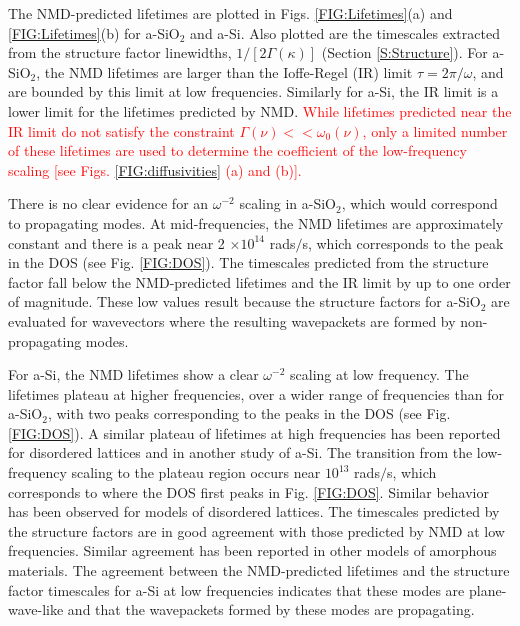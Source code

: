 \documentclass[aps,prb,twocolumn,superscriptaddress,footinbib,amsmath,amssymb,floatfix]{revtex4}
\begin{document}
The NMD-predicted lifetimes are plotted in Figs. 
\ref{FIG:Lifetimes}(a) and \ref{FIG:Lifetimes}(b) 
for a-SiO$_2$ and a-Si. 
Also plotted are the timescales extracted from the structure 
factor linewidths, $1/[2\Gamma(\kappa)]$ (Section \ref{S:Structure}). 
For a-SiO$_2$, the NMD lifetimes are larger than 
the Ioffe-Regel (IR) limit $\tau = 2\pi/\omega$,
\cite{taraskin_determination_1999} and are bounded by  
this limit at low frequencies. Similarly for a-Si, the IR limit is 
a lower limit for the lifetimes predicted by NMD. 
\textcolor{red}{
While lifetimes 
predicted near the IR limit do not satisfy the constraint 
$\Gamma(\nu) << \omega_0(\nu)$, only a limited number of these 
lifetimes are used to determine the coefficient of the low-frequency 
scaling [see Figs. \ref{FIG:diffusivities} (a) and (b)]. 
}

There is no clear evidence for an $\omega^{-2}$ scaling in a-SiO$_2$, 
which would correspond to propagating modes.  
At mid-frequencies, the NMD lifetimes are approximately constant and  
there is a peak near 2 $\times 10^{14}$ rads$/$s, which corresponds to 
the peak in the DOS (see Fig. \ref{FIG:DOS}). 
The timescales predicted from the 
structure factor fall below the NMD-predicted lifetimes 
and the IR limit by up to one order of magnitude. 
These low values result because the structure factors 
for a-SiO$_2$ are evaluated for wavevectors where the resulting 
wavepackets are formed by non-propagating modes.
\cite{feldman_thermal_1993,feldman_numerical_1999}

For a-Si, the NMD lifetimes show a clear $\omega^{-2}$ 
scaling at low frequency. 
The lifetimes plateau at higher frequencies,
over a wider range of frequencies than for a-SiO$_2$, with two peaks 
corresponding to the peaks in the DOS (see Fig. \ref{FIG:DOS}). 
A similar plateau of lifetimes at high frequencies has been 
reported for disordered lattices
\cite{sheng_heat_1991,larkin_predicting_2013} and in 
another study of a-Si.\cite{he_heat_2011} 
The transition from the low-frequency scaling to 
the plateau region occurs near 
$10^{13}$ rads$/$s, which corresponds to where the DOS first peaks 
in Fig. \ref{FIG:DOS}. 
Similar behavior has been observed for models of disordered lattices.
\cite{larkin_predicting_2013} The timescales predicted by the 
structure factors are in good agreement with those predicted by NMD 
at low frequencies. Similar agreement has been reported in other 
models of amorphous materials.
\cite{mazzacurati_low-frequency_1996,bickham_calculation_1998,
bickham_numerical_1999,feldman_numerical_1999} 
The agreement between the 
NMD-predicted lifetimes and the structure factor timescales for a-Si 
at low frequencies indicates that these modes are plane-wave-like 
and that the wavepackets formed by these modes are propagating.
\cite{feldman_thermal_1993,feldman_numerical_1999}
\end{document}
